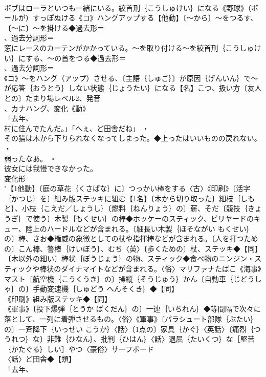 \documentclass[8pt]{extreport}
\begin{document}
\begin{CJK}{UTF8}{min}
\\	ボブはローラといつも一緒にいる。絞首刑｛こうしゅけい｝になる《野球》（ボールが）すっぽぬける《コ》ハングアップする【他動】〔～から〕～をつるす、〔～に〕～を掛ける◆過去形＝
\\	、過去分詞形＝
\\	窓にレースのカーテンがかかっている。～を取り付ける～を絞首刑｛こうしゅけい｝にする、～の首をつる◆過去形＝
\\	、過去分詞形＝
\\	《コ》～をハング（アップ）させる、〔主語｛しゅご｝〕が原因｛げんいん｝で～が応答｛おうとう｝しない状態｛じょうたい｝になる【名】こつ、扱い方〔友人との〕たまり場レベル2、発音
\\	、カナハング、変化《動》
\\	「去年、
\\	村に住んでたんだ。」「へぇ、ど田舎だね」 ・
\\	その猫は木から下りられなくなってしまった。◆上ったはいいものの戻れない。 ・
\\	弱ったなあ。 ・
\\	彼女には我慢できなかった。
\\	変化形 
\\	"【1他動】〔庭の草花｛くさばな｝に〕つっかい棒をする〈古〉《印刷》〔活字｛かつじ｝を〕組み版ステッキに組む【1名】〔木から切り取った〕細枝｛しもと｝、小枝｛こえだ／しょうし｝〔燃料｛ねんりょう｝の〕薪、そだ〔競技｛きょうぎ｝で使う〕木製｛もくせい｝の棒◆ホッケーのスティック、ビリヤードのキュー、陸上のハードルなどが含まれる。〔細長い木製｛ほそながい もくせい｝の〕棒、さお◆権威の象徴としての杖や指揮棒などが含まれる。〔人を打つための〕こん棒、警棒｛けいぼう｝、むち〈英〉〔歩くための〕杖、ステッキ◆【同】
\\	〔木以外の細い〕棒状｛ぼうじょう｝の物、スティック◆食べ物のニンジン・スティックや棒状のダイナマイトなどが含まれる。〈俗〉マリファナたばこ《海事》マスト〔航空機｛こうくうき｝の〕操縦｛そうじゅう｝かん〔自動車｛じどうしゃ｝の〕手動変速機｛しゅどう へんそくき｝◆【同】
\\	《印刷》組み版ステッキ◆【同】
\\	《軍事》〔投下爆弾｛とうか ばくだん｝の〕一連｛いちれん｝◆等間隔で次々に落として、一列に着弾させるもの。〈俗〉《軍事》〔パラシュート部隊｛ぶたい｝の〕一斉降下｛いっせい こうか｝〈話〉〔1点の〕家具｛かぐ｝〈英話〉〔痛烈｛つうれつ｝な〕非難｛ひなん｝、批判｛ひはん｝〈話〉退屈｛たいくつ｝な［堅苦｛かたぐる｝しい］やつ〈豪俗〉サーフボード
\\	〈話〉ど田舎◆【類】
\\	「去年、

\end{CJK}
\end{document}
